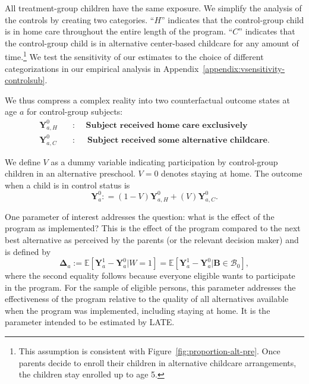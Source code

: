 All treatment-group children have the same exposure. We simplify the analysis of the controls by creating two categories. ``$H$'' indicates that the control-group child is in home care throughout the entire length of the program. ``$C$'' indicates that the control-group child is in alternative center-based childcare for any amount of time.\footnote{This assumption is consistent with Figure~\ref{fig:proportion-alt-pre}. Once parents decide to enroll their children in alternative childcare arrangements, the children stay enrolled up to age 5.} We test the sensitivity of our estimates to the choice of different categorizations in our empirical analysis in Appendix~\ref{appendix:vsensitivity-controlsub}.

We thus compress a complex reality into two counterfactual outcome states at age $a$ for control-group subjects:
\begin{align*}
\bm{Y}_{a,H}^0 \quad &: \quad \textbf{ Subject received home care exclusively} \\
\bm{Y}_{a,C}^0 \quad &: \quad \textbf{ Subject received some alternative childcare}.
\end{align*}

We define $V$ as a dummy variable indicating participation by control-group children in an alternative preschool. $V=0$ denotes staying at home. The outcome when a child is in control status is
\begin{equation}
\bm{Y}^0_a : = \left( 1 - V \right) \bm{Y}^0_{a,H} + \left( V \right) \bm{Y}^0_{a,C}. \label{eq:meandiff}
\end{equation}

One parameter of interest addresses the question: what is the effect of the program as implemented? This is the effect of the program compared to the next best alternative as perceived by the parents (or the relevant decision maker) and is defined by
\begin{equation}\label{eq:effect}
\bm{\Delta}_a := \mathbb{E} \left[ \bm{Y}^1_a -  \bm{Y}^0_a | W =1 \right] = \mathbb{E} \left[\bm{Y}^1_a - \bm{Y}^0_a | \bm{B} \in \mathcal{B}_0 \right],
\end{equation}
where the second equality follows because everyone eligible wants to participate in the program. For the sample of eligible persons, this parameter addresses the effectiveness of the program relative to the quality of all alternatives available when the program was implemented, including staying at home. It is the parameter intended to be estimated by LATE.

